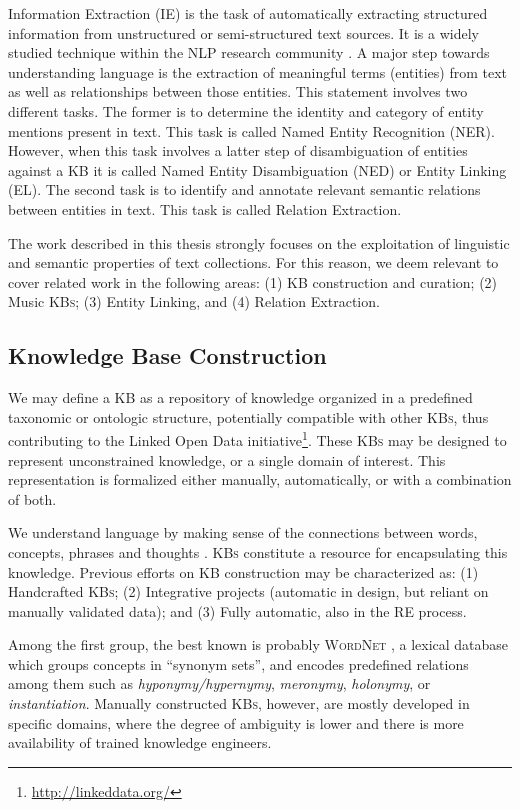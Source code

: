 Information Extraction (IE) is the task of automatically extracting structured information from unstructured or semi-structured text sources. It is a widely studied technique within the NLP research community \cite{cowie1996information}.
A major step towards understanding language is the extraction of meaningful terms (entities) from text as well as relationships between those entities. This statement involves two different tasks. The former is to determine the identity and category of entity mentions present in text. This task is called Named Entity Recognition (NER). However, when this task involves a latter step of disambiguation of entities against a KB it is called Named Entity Disambiguation (NED) or Entity Linking (EL). The second task is to identify and annotate relevant semantic relations between entities in text. This task is called Relation Extraction.

The work described in this thesis strongly focuses on the exploitation of linguistic and semantic properties of text collections. For this reason, we deem relevant to cover related work in the following areas: (1) \textsc{KB} construction and curation; (2) Music \textsc{KBs}; (3) Entity Linking, and (4) Relation Extraction.


\subsection{Knowledge Base Construction}
\label{sec:SOA:nlu:kbs}

We may define a \textsc{KB} as a repository of knowledge organized in a predefined taxonomic or ontologic structure, potentially compatible with other \textsc{KBs}, thus contributing to the Linked Open Data initiative\footnote{\url{http://linkeddata.org/}}. These \textsc{KBs} may be designed to represent unconstrained knowledge, or a single domain of interest. This representation is formalized either manually, automatically, or with a combination of both.

We understand language by making sense of the connections between words, concepts, phrases and thoughts \citep{Havasietal2007}. \textsc{KBs} constitute a resource for encapsulating this knowledge. Previous efforts on \textsc{KB} construction may be characterized as: (1) Handcrafted \textsc{KBs}; (2) Integrative projects (automatic in design, but reliant on manually validated data); and (3) Fully automatic, also in the \textsc{RE} process.

Among the first group, the best known is probably \textsc{WordNet} \citep{Miller1995}, a lexical database which groups concepts in ``synonym sets'', and encodes predefined relations among them such as \textit{hyponymy/hypernymy}, \textit{meronymy}, \textit{holonymy}, or \textit{instantiation}. Manually constructed \textsc{KBs}, however, are mostly developed in specific domains, where the degree of ambiguity is lower and there is more availability of trained knowledge engineers.


